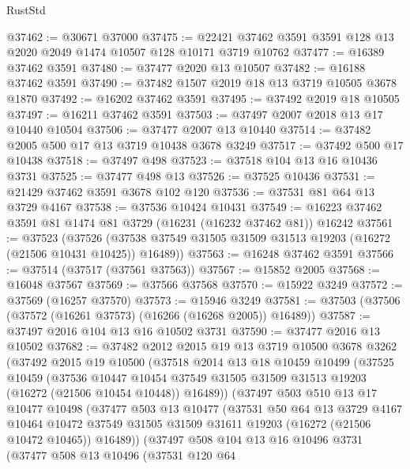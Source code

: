\begin{lexlean}{RustStd}
\begin{coremodule}
@37462 := @30671 @37000
@37475 := @22421 @37462 @3591 @3591 @128 @13 @2020 @2049 @1474 @10507 @128 @10171 @3719 @10762
@37477 := @16389 @37462 @3591
@37480 := @37477 @2020 @13 @10507
@37482 := @16188 @37462 @3591
@37490 := @37482 @1507 @2019 @18 @13 @3719 @10505 @3678 @1870
@37492 := @16202 @37462 @3591
@37495 := @37492 @2019 @18 @10505
@37497 := @16211 @37462 @3591
@37503 := @37497 @2007 @2018 @13 @17 @10440 @10504
@37506 := @37477 @2007 @13 @10440
@37514 := @37482 @2005 @500 @17 @13 @3719 @10438 @3678 @3249
@37517 := @37492 @500 @17 @10438
@37518 := @37497 @498
@37523 := @37518 @104 @13 @16 @10436 @3731
@37525 := @37477 @498 @13
@37526 := @37525 @10436
@37531 := @21429 @37462 @3591 @3678 @102 @120
@37536 := @37531 @81 @64 @13 @3729 @4167
@37538 := @37536 @10424 @10431
@37549 := @16223 @37462 @3591 @81 @1474 @81 @3729 (@16231 (@16232 @37462 @81)) @16242
@37561 := @37523
    (@37526 (@37538 @37549 @31505 @31509 @31513 @19203 (@16272 (@21506 @10431 @10425)) @16489))
@37563 := @16248 @37462 @3591
@37566 := @37514 (@37517 (@37561 @37563))
@37567 := @15852 @2005
@37568 := @16048 @37567
@37569 := @37566 @37568
@37570 := @15922 @3249
@37572 := @37569 (@16257 @37570)
@37573 := @15946 @3249
@37581 := @37503 (@37506 (@37572 (@16261 @37573) (@16266 (@16268 @2005)) @16489))
@37587 := @37497 @2016 @104 @13 @16 @10502 @3731
@37590 := @37477 @2016 @13 @10502
@37682 := @37482
    @2012
    @2015
    @19
    @13
    @3719
    @10500
    @3678
    @3262
    (@37492
      @2015
      @19
      @10500
      (@37518
        @2014
        @13
        @18
        @10459
        @10499
        (@37525
          @10459
          (@37536
            @10447
            @10454
            @37549
            @31505
            @31509
            @31513
            @19203
            (@16272 (@21506 @10454 @10448))
            @16489))
        (@37497
          @503
          @510
          @13
          @17
          @10477
          @10498
          (@37477
            @503
            @13
            @10477
            (@37531
              @50
              @64
              @13
              @3729
              @4167
              @10464
              @10472
              @37549
              @31505
              @31509
              @31611
              @19203
              (@16272 (@21506 @10472 @10465))
              @16489))
          (@37497
            @508
            @104
            @13
            @16
            @10496
            @3731
            (@37477
              @508
              @13
              @10496
              (@37531
                @120
                @64

\end{coremodule}
\end{lexlean}
